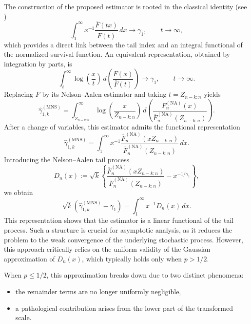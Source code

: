 \documentclass[reqno,openbib,runningheads,a4paper,12pt]{amsart}%
\begin{document}
\noindent The construction of the proposed estimator is rooted in the
classical identity (see \cite{MNS2025})
\[
\int_{1}^{\infty}x^{-1}\frac{\overline{F}(tx)}{\overline{F}(t)}%
\,dx\longrightarrow\gamma_{1},\qquad t\rightarrow\infty,
\]
which provides a direct link between the tail index and an integral functional
of the normalized survival function. An equivalent representation, obtained by
integration by parts, is
\begin{equation}
\int_{t}^{\infty}\log\!\left(  \frac{x}{t}\right)  \,d\!\left(  \frac
{F(x)}{\overline{F}(t)}\right)  \longrightarrow\gamma_{1},\qquad
t\rightarrow\infty. \label{log}%
\end{equation}
Replacing $F$ by its Nelson--Aalen estimator and taking $t=Z_{n-k:n}$ yields
\begin{equation}
\widehat{\gamma}_{1,k}^{(\mathrm{MNS})}=\int_{Z_{n-k:n}}^{\infty}\log\!\left(
\frac{x}{Z_{n-k:n}}\right)  \,d\!\left(  \frac{F_{n}^{(\mathrm{NA})}%
(x)}{\overline{F}_{n}^{(\mathrm{NA})}(Z_{n-k:n})}\right)  . \label{gchap}%
\end{equation}
After a change of variables, this estimator admits the functional
representation
\[
\widehat{\gamma}_{1,k}^{(\mathrm{MNS})}=\int_{1}^{\infty}x^{-1}\frac
{\overline{F}_{n}^{(\mathrm{NA})}(xZ_{n-k:n})}{\overline{F}_{n}^{(\mathrm{NA}%
)}(Z_{n-k:n})}\,dx.
\]
Introducing the Nelson--Aalen tail process
\[
D_{n}(x):=\sqrt{k}\left\{  \frac{\overline{F}_{n}^{(\mathrm{NA})}(xZ_{n-k:n}%
)}{\overline{F}_{n}^{(\mathrm{NA})}(Z_{n-k:n})}-x^{-1/\gamma_{1}}\right\}  ,
\]
we obtain
\[
\sqrt{k}\left(  \widehat{\gamma}_{1,k}^{(\mathrm{MNS})}-\gamma_{1}\right)
=\int_{1}^{\infty}x^{-1}D_{n}(x)\,dx.
\]
This representation shows that the estimator is a linear functional of the
tail process. Such a structure is crucial for asymptotic analysis, as it
reduces the problem to the weak convergence of the underlying stochastic
process. However, this approach critically relies on the uniform validity of
the Gaussian approximation of $D_{n}(x)$, which typically holds only when
$p>1/2$.\smallskip

\noindent When $p\leq1/2$, this approximation breaks down due to two distinct phenomena:

\begin{itemize}
\item the remainder terms are no longer uniformly negligible,

\item a pathological contribution arises from the lower part of the
transformed scale.
\end{itemize}
\end{document}
